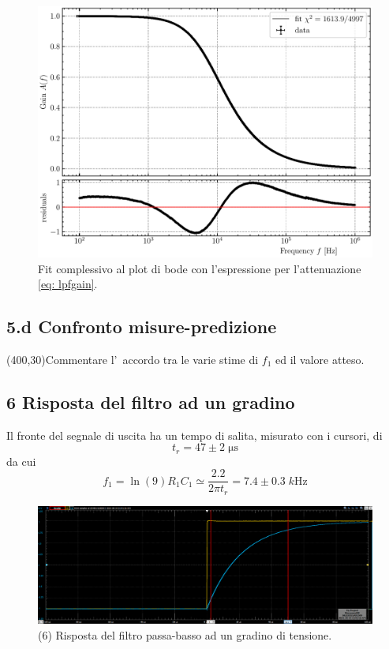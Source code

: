 \documentclass[10pt,a4paper]{article}
\begin{document}
\begin{figure}[htbp]
\centering
\includegraphics[scale=0.7]{lpfbodefit}
\caption{Fit complessivo al plot di bode con l'espressione per l'attenuazione
\eqref{eq: lpfgain}.\label{fig: corner}}
\end{figure}

\subsection*{5.d Confronto misure-predizione}
\vspace{0.5cm}
\framebox(400,30){Commentare l'~accordo tra le varie stime di $f_1$ ed il 
valore atteso.}

\subsection*{6 Risposta del filtro ad un gradino}
Il fronte del segnale di uscita ha un tempo di salita, misurato con i cursori, 
di 
\[
t_r = 47 \pm 2 \; \si{\micro\second}
\]
da cui 
\[
f_1 = \ln(9) R_1 C_1 \simeq \frac{2.2}{2\pi t_r} = 7.4 \pm 0.3 \; \si{k\Hz}
\]
\begin{figure}[htb]
\centering
\includegraphics[scale=0.35]{rc2k10nF_rise}
\caption{(6) Risposta del filtro passa-basso ad un gradino di tensione.}
\end{figure}
\end{document}

